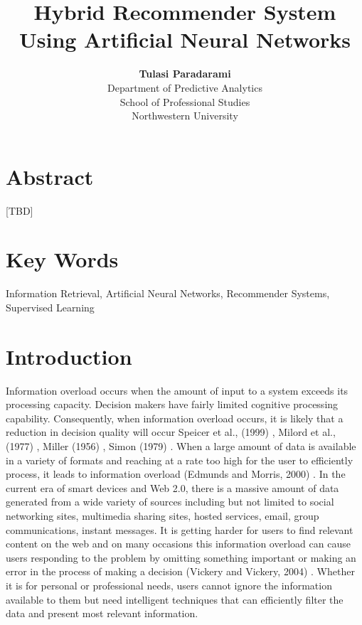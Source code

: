 \documentclass[12pt]{article}
\title{\textbf{Hybrid Recommender System \\Using Artificial Neural Networks}}
\author{\textbf{Tulasi Paradarami}\\Department of Predictive Analytics\\School of Professional Studies\\Northwestern University}
\date{}
\begin{document}
\maketitle
\normalsize

\section*{Abstract}

[TBD]

\section*{Key Words}

Information Retrieval, Artificial Neural Networks, Recommender Systems, Supervised Learning

\newpage\section{Introduction}

Information overload occurs when the amount of input to a system exceeds its processing capacity. Decision makers have fairly limited cognitive processing capability. Consequently, when information overload occurs, it is likely that a reduction in decision quality will occur Speicer et al., (1999) \cite{speier}, Milord et al., (1977) \cite{milord}, Miller (1956) \cite{miller g. a. 1956.txt}, Simon (1979) \cite{simon h. a. 1979.txt}. When a large amount of data is available in a variety of formats and reaching at a rate too high for the user to efficiently process, it leads to information overload (Edmunds and Morris, 2000) \cite{edmunds}. In the current era of smart devices and Web 2.0, there is a massive amount of data generated from a wide variety of sources including but not limited to social networking sites, multimedia sharing sites, hosted services, email, group communications, instant messages. It is getting harder for users to find relevant content on the web and on many occasions this information overload can cause users responding to the problem by omitting something important or making an error in the process of making a decision (Vickery and Vickery, 2004) \cite{vickery}. Whether it is for personal or professional needs, users cannot ignore the information available to them but need intelligent techniques that can efficiently filter the data and present most relevant information.
\end{document}
